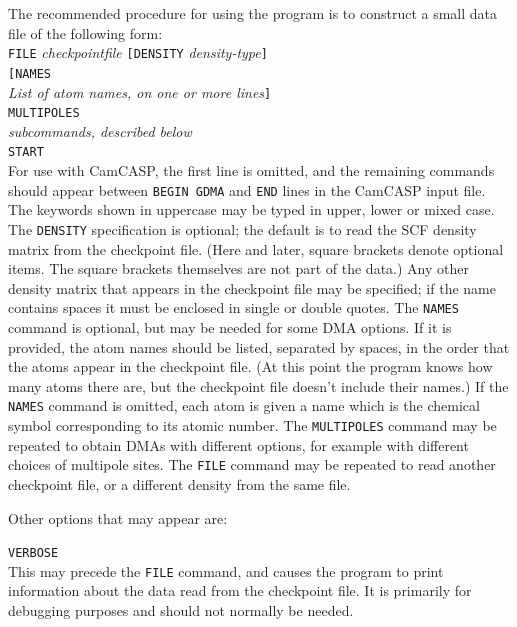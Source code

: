 \documentclass[12pt,txfonts]{paper}
\begin{document}
The recommended procedure for using the program is to
construct a small data file of the following form:\\
\hspace*{2 em}\verb/FILE/ \emph{checkpointfile} %
\verb/[DENSITY/ \emph{density-type}\verb/]/\\
\hspace*{2 em}\verb/[NAMES/\\
\hspace*{2 em}\quad\emph{List of atom names, on one
 or more lines}\verb/]/\\
\hspace*{2 em}\verb/MULTIPOLES/\\
\hspace*{2 em}\quad\emph{subcommands, described below}\\
\hspace*{2 em}\verb/START/\\
For use with {\sc CamCASP}, the first line is omitted, and the
remaining commands should appear between \verb+BEGIN GDMA+ and 
\verb+END+ lines in the {\sc CamCASP} input file. 
The keywords shown in uppercase may be typed in upper, lower or mixed
case. The \verb/DENSITY/ specification is optional; the
default is to read the SCF density matrix from the checkpoint file.
(Here and later, square brackets denote optional items. The square
brackets themselves are not part of the data.)
Any other density matrix that appears in the checkpoint file may be
specified; if the name contains spaces it must be enclosed in single
or double quotes. The \verb/NAMES/
command is optional, but may be needed for some DMA options. If it is
provided, the atom names should be listed, separated by spaces, in the
order that the atoms appear in the checkpoint file. (At this point the
program knows how many atoms there are, but the checkpoint file
doesn't include their names.) If the
\verb/NAMES/ command is omitted, each atom is given a name which is
the chemical symbol corresponding to its atomic number. The
\verb/MULTIPOLES/ command may be repeated to obtain DMAs with
different options, for example with different choices of multipole
sites. The \verb/FILE/ command may be repeated to read another
checkpoint file, or a different density from the same file.

Other options that may appear are:

\hspace*{2 em}\verb/VERBOSE/\\
This may precede the \verb+FILE+ command, and causes the program to
print information about the data read from the checkpoint file. It is
primarily for debugging purposes and should not normally be needed.
\end{document}
